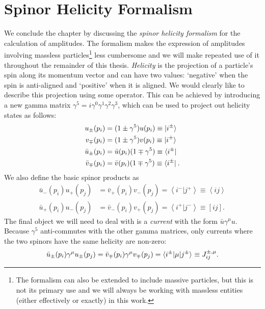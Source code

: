 \section{Spinor Helicity Formalism} 
We conclude the chapter by discussing the \emph{spinor helicity formalism} for the calculation of amplitudes. The formalism makes the expression of amplitudes involving massless particles\footnote{The formalism can also be extended to include massive particles, but this is not its primary use and we will always be working with massless entities (either effectively or exactly) in this work.} less cumbersome and we will make repeated use of it throughout the remainder of this thesis. \emph{Helicity} is the projection of a particle's spin along its momentum vector and can have two values: `negative' when the spin is anti-aligned and `positive' when it is aligned. We would clearly like to describe this projection using some operator. This can be achieved by introducing a new gamma matrix $\gamma^5 = i \gamma^0 \gamma^1 \gamma^2 \gamma^3$, which can be used to project out helicity states as follows:
\begin{subequations}
\begin{align}
u_{\pm}(p_i) &= (1 \pm \gamma^5)u(p_i) \equiv \mathinner{\lvert i^\pm\rangle}_{\hspace{-0.1em}}\\
v_{\mp}(p_i) &= (1 \pm \gamma^5)v(p_i) \equiv \mathinner{\lvert i^\pm\rangle}_{\hspace{-0.1em}}\\
\bar{u}_{\pm}(p_i) &= \bar{u}(p_i) (1 \mp \gamma^5) \equiv \mathinner{\langle i^\pm\rvert}_{}\\
\bar{v}_{\mp}(p_i) &= \bar{v}(p_i) (1 \mp \gamma^5) \equiv \mathinner{\langle i^\pm\rvert}_{}.
\end{align}
\end{subequations}
We also define the basic spinor products as
\begin{subequations}
\begin{align}
\bar{u}_-(p_i)u_+(p_j) &= \bar{v}_+(p_i)v_-(p_j) = \left<i^- | j^+ \right> \equiv \left< i j \right> \\
\bar{u}_+(p_i)u_-(p_j) &= \bar{v}_-(p_i)v_+(p_j) = \left<i^+ | j^- \right> \equiv \left[ i j \right].
\end{align}
\end{subequations}
The final object we will need to deal with is a \emph{current} with the form $\bar{u} \gamma^\mu u$. Because $\gamma^5$ anti-commutes with the other gamma matrices, only currents where the two spinors have the same helicity are non-zero:
\begin{equation}
\bar{u}_{\pm}(p_i) \gamma^\mu u_{\pm}(p_j) = \bar{v}_{\mp}(p_i) \gamma^\mu v_{\mp}(p_j) = \mathinner{\langle i^\pm\vert\mu\vert j^\pm\rangle}_{} \equiv J_{ij}^{\pm, \mu}.
\end{equation}
